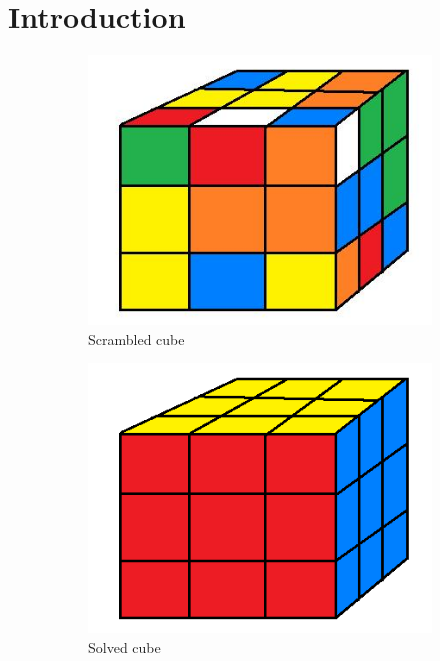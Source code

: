 \documentclass[a4paper,11pt]{kth-mag}
\begin{document}
\chapter{Introduction}
\begin{figure}
	\centering
	\begin{subfigure}[b]{0.3\textwidth}
		\includegraphics[width=\textwidth]{figs/scramble.jpg}
		\caption{Scrambled cube}
		\label{fig_1}
	\end{subfigure}
	\begin{subfigure}[b]{0.3\textwidth}
		\includegraphics[width=\textwidth]{figs/DONE.png}
		\caption{Solved cube}
		\label{fig_2}
	\end{subfigure}
	\caption{}
\end{figure}
\end{document}
